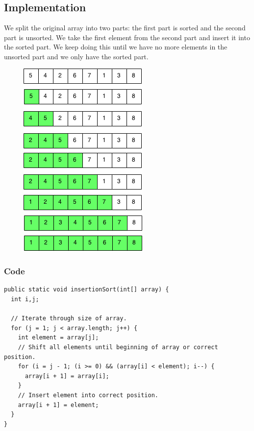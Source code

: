 \documentclass[11pt,oneside]{book}
\makeatletter
\def\maxwidth#1{\ifdim\Gin@nat@width>#1 #1\else\Gin@nat@width\fi}
\makeatother
\begin{document}
\subsection{Implementation}

We split the original array into two parts: the first part is sorted and the second part is unsorted. We take the first element from the second part and insert it into the sorted part. We keep doing this until we have no more elements in the unsorted part and we only have the sorted part.

\vspace{5px}\begin{figure}[H]\centering
        \includegraphics[width=0.66\maxwidth{\textwidth}]{insertion_sort.png}
        \end{figure}

\subsubsection{Code}

\begin{lstlisting}
public static void insertionSort(int[] array) {
  int i,j;

  // Iterate through size of array.
  for (j = 1; j < array.length; j++) {
    int element = array[j];
    // Shift all elements until beginning of array or correct position.
    for (i = j - 1; (i >= 0) && (array[i] < element); i--) {
      array[i + 1] = array[i];
    }
    // Insert element into correct position.
    array[i + 1] = element;
  }
}
\end{lstlisting}
\end{document}
